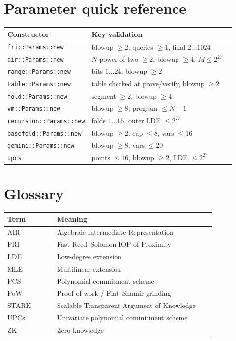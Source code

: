 \documentclass[11pt,a4paper]{article}
\begin{document}
\section{Parameter quick reference}

\begin{longtable}{@{}L{0.28\linewidth}L{0.64\linewidth}@{}}
\toprule
Constructor & Key validation \\
\midrule
\endhead
\texttt{fri::Params::new} & blowup $\ge2$, queries $\ge1$, final $2\dots1024$ \\
\texttt{air::Params::new} & $N$ power of two $\ge2$, blowup $\ge4$, $M\le2^{27}$ \\
\texttt{range::Params::new} & bits $1\dots24$, blowup $\ge2$ \\
\texttt{table::Params::new} & table checked at prove/verify, blowup $\ge2$ \\
\texttt{fold::Params::new} & segment $\ge2$, blowup $\ge4$ \\
\texttt{vm::Params::new} & blowup $\ge8$, program $\le N-1$ \\
\texttt{recursion::Params::new} & folds $1\dots16$, outer LDE $\le2^{27}$ \\
\texttt{basefold::Params::new} & blowup $\ge2$, cap $\le8$, vars $\le16$ \\
\texttt{gemini::Params::new} & blowup $\ge8$, vars $\le20$ \\
\texttt{upcs} & points $\le16$, blowup $\ge2$, LDE $\le2^{27}$ \\
\bottomrule
\end{longtable}

\section{Glossary}

\begin{longtable}{@{}L{0.22\linewidth}L{0.70\linewidth}@{}}
\toprule
Term & Meaning \\
\midrule
\endhead
AIR & Algebraic Intermediate Representation \\
FRI & Fast Reed--Solomon IOP of Proximity \\
LDE & Low-degree extension \\
MLE & Multilinear extension \\
PCS & Polynomial commitment scheme \\
PoW & Proof of work / Fiat--Shamir grinding \\
STARK & Scalable Transparent Argument of Knowledge \\
UPCs & Univariate polynomial commitment scheme \\
ZK & Zero knowledge \\
\bottomrule
\end{longtable}
\end{document}
